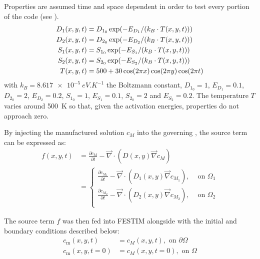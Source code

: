 Properties are assumed time and space dependent in order to test every portion of the code (see ).
\begin{subequations}
    \begin{align}
        D_1(x, y, t) & =  D_{1_0} \exp(-E_{D_1}/(k_B \cdot T(x,y, t) )) \\
        D_2(x, y, t) & =  D_{2_0} \exp(-E_{D_2}/(k_B \cdot T(x,y, t) )) \\
        S_1(x, y, t) & =  S_{1_0} \exp(-E_{S_1}/(k_B \cdot T(x,y, t) )) \\
        S_2(x, y, t) & =  S_{2_0} \exp(-E_{S_2}/(k_B \cdot T(x,y, t) )) \\
        T(x, y, t) & = 500 + 30 \cos(2\pi x) \cos(2 \pi y) \cos(2 \pi t)
\end{align} \labeq{MMS properties}
\end{subequations}
with ${k_B = \SI{8.617e-5}{eV.K^{-1}}}$ the Boltzmann constant, $D_{1_0} = 1$, $E_{D_1} = 0.1$, $D_{2_0} = 2$, $E_{D_2} = 0.2$, $S_{1_0} = 1$, $E_{S_1} = 0.1$, $S_{2_0} = 2$ and $E_{S_2} = 0.2$.
The temperature $T$ varies around \SI{500}{K} so that, given the activation energies, properties do not approach zero.

By injecting the manufactured solution $c_M$ into the governing , the source term can be expressed as:
\begin{align}
    f(x, y, t) &= \frac{\partial c_M}{\partial t} - \vec{\nabla} \cdot\left(D(x, y)
    \vec{\nabla}c_M\right) \nonumber \\
    &= \begin{cases}
        \frac{\partial c_{M_1}}{\partial t} - \vec{\nabla} \cdot\left(D_1(x, y)
    \vec{\nabla}c_{M_1}\right),& \text{ on } \Omega_1\\
    \frac{\partial c_{M_2}}{\partial t} - \vec{\nabla} \cdot\left(D_2(x, y)
    \vec{\nabla}c_{M_2}\right),& \text{ on } \Omega_2\\
    \end{cases}
\end{align}

The source term $f$ was then fed into FESTIM alongside with the initial and boundary conditions described below:
\begin{subequations}
    \begin{align}
        c_\mathrm{m}(x, y, t) &= c_M(x, y, t), \text{ on } \partial \Omega \\
        c_\mathrm{m}(x, y, t=0) &= c_M(x, y, t=0), \text{ on } \Omega
    \end{align}
\end{subequations}

